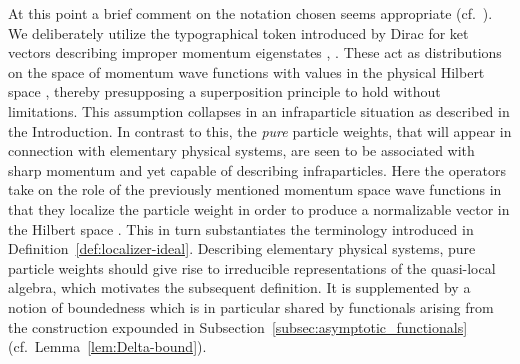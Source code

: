 \documentclass[a4paper,a4paper]{article}
\numberwithin{equation}{section}
\providecommand{\Lfrak}{\mathfrak{L}}
\providecommand{\pib}{\mathib{p}}
\providecommand{\Hscr}{\mathscr{H}}
\providecommand{\Rs}{\mathbb{R}^s}
\theoremstyle{definition}
\theoremstyle{plain}
\theoremstyle{remark}
\providecommand{\ket}[1]{\vert #1 \rangle}
\begin{document}
  At this point a brief comment on the notation chosen seems
  appropriate (cf.~\cite{buchholz/porrmann/stein:1991}). We
  deliberately utilize the typographical token \myHighlight{$\ket{~.~}$}\coordHE{} introduced
  by Dirac \label{page:dirac-kets} \cite[\S\,23]{dirac:1958} for ket
  vectors describing improper momentum eigenstates \myHighlight{$\ket{\pib}$}\coordHE{}, \myHighlight{$\pib
  \in \Rs$}\coordHE{}. These act as distributions on the space of momentum wave
  functions with values in the physical Hilbert space \myHighlight{$\Hscr$}\coordHE{}, thereby
  presupposing a superposition principle to hold without limitations.
  This assumption collapses in an infraparticle situation as described
  in the Introduction. In contrast to this, the \emph{pure} particle
  weights, that will appear in connection with elementary physical
  systems, are seen to be associated with sharp momentum and yet
  capable of describing infraparticles. Here the operators \myHighlight{$L \in
  \Lfrak$}\coordHE{} take on the role of the previously mentioned momentum space
  wave functions in that they localize the particle weight in order to
  produce a normalizable vector \myHighlight{$\ket{L}$}\coordHE{} in the Hilbert space
  \myHighlight{$\Hscr_w$}\coordHE{}. This in turn substantiates the terminology introduced in
  Definition~\ref{def:localizer-ideal}.  Describing elementary
  physical systems, pure particle weights should give rise to
  irreducible representations of the quasi-local algebra, which
  motivates the subsequent definition. It is supplemented by a notion
  of boundedness which is in particular shared by functionals \myHighlight{$\sigma$}\coordHE{}
  arising from the construction expounded in
  Subsection~\ref{subsec:asymptotic_functionals}
  (cf.~Lemma~\ref{lem:Delta-bound}).
\end{document}
